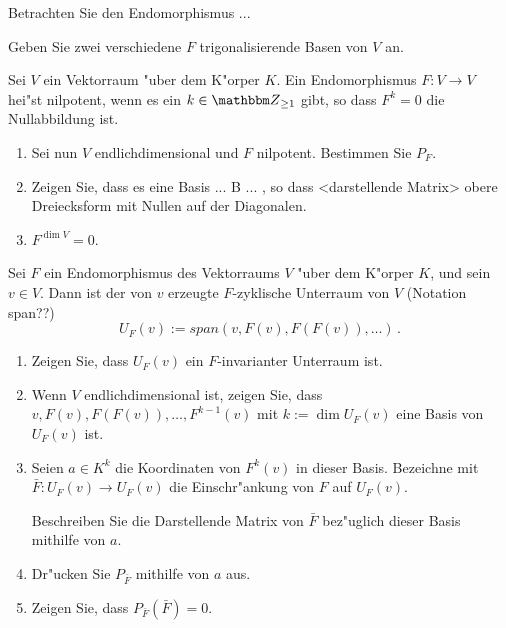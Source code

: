\documentclass[a4,11pt]{article}
\begin{document}
\vspace*{-17mm}
{
\kopf
}


\begin{aufgabe}[4 Punkte]
  Betrachten Sie den Endomorphismus ...

  Geben Sie zwei verschiedene $F$ trigonalisierende Basen von $V$ an.
\end{aufgabe}

\begin{aufgabe}[4 Punkte]
  Sei $V$ ein Vektorraum "uber dem K"orper
  $K$. Ein Endomorphismus $F \colon V \to V$ hei"st nilpotent, wenn es
  ein $k \in \Z_{\ge 1}$ gibt, so dass $F^k=0$ die Nullabbildung ist.

\begin{enumerate}
\item Sei nun $V$ endlichdimensional und $F$ nilpotent. Bestimmen Sie
  $P_F$.
\item Zeigen Sie, dass es eine Basis  ... B ... , so dass
  <darstellende Matrix> obere Dreiecksform mit Nullen auf der
  Diagonalen.
\item $F^{\dim V} = 0$.
\end{enumerate}

\end{aufgabe}

\begin{aufgabe}[4 Punkte]
Sei $F$ ein Endomorphismus des Vektorraums $V$ "uber dem K"orper $K$,
und sein $v \in V$.
Dann ist der von $v$ erzeugte $F$-zyklische Unterraum von $V$ (Notation span??)
$$ U_F(v) := span(v, F(v), F(F(v)), \ldots) \,.$$
  
  \begin{enumerate}
  \item Zeigen Sie, dass $U_F(v)$ ein $F$-invarianter Unterraum ist.
  \item Wenn $V$ endlichdimensional ist, zeigen Sie, dass $v, F(v),
    F(F(v)), \ldots, F^{k-1}(v)$ mit $k := \dim U_F(v)$ eine
    Basis von $U_F(v)$ ist. 
  \item Seien $a \in K^k$ die Koordinaten von $F^k(v)$ in dieser Basis.
    Bezeichne mit $\bar F \colon U_F(v) \to U_F(v)$ die 
    Einschr"ankung von $F$ auf $U_F(v)$.
    
    Beschreiben Sie die Darstellende Matrix von $\bar F$ bez"uglich
    dieser Basis mithilfe von $a$.
  \item Dr"ucken Sie $P_{\bar F}$ mithilfe von $a$ aus.
  \item Zeigen Sie, dass $P_{\bar F}(\bar F) = 0$.
\end{enumerate}

\end{aufgabe}
\end{document}
